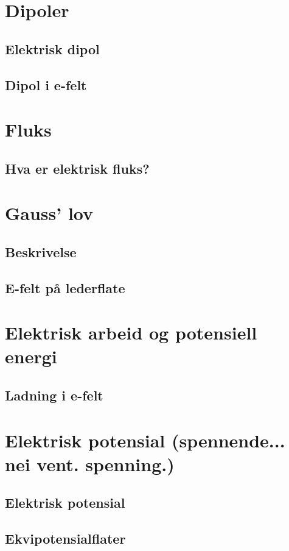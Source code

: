 \documentclass{article}
\begin{document}
  \section{Dipoler}
    \subsection{Elektrisk dipol}
      
    \subsection{Dipol i e-felt}
      
  \section{Fluks}
    \subsection{Hva er elektrisk fluks?}
      
  \section{Gauss' lov}
    \subsection{Beskrivelse}
      
    \subsection{E-felt på lederflate}
      
  \section{Elektrisk arbeid og potensiell energi}
    \subsection{Ladning i e-felt}
      
  \section{Elektrisk potensial (spennende... nei vent. spenning.)}
    \subsection{Elektrisk potensial}
      
    \subsection{Ekvipotensialflater}
      
\end{document}
